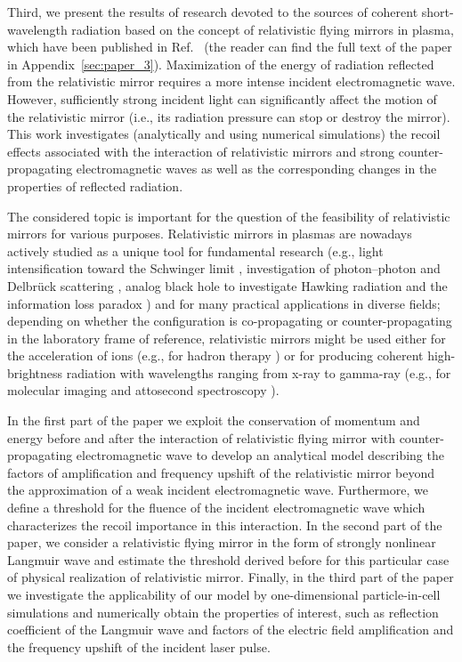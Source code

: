 \documentclass[10pt, twoside, a4paper, openright]{report}
\begin{document}
Third, we present the results of research devoted to the sources of coherent short-wavelength radiation based on the concept of relativistic flying mirrors in plasma, which have been published in Ref.~ (the reader can find the full text of the paper in Appendix~\ref{sec:paper_3}). Maximization of the energy of radiation reflected from the relativistic mirror requires a more intense incident electromagnetic wave. However, sufficiently strong incident light can significantly affect the motion of the relativistic mirror (i.e., its radiation pressure can stop or destroy the mirror). This work investigates (analytically and using numerical simulations) the recoil effects associated with the interaction of relativistic mirrors and strong counter-propagating electromagnetic waves as well as the corresponding changes in the properties of reflected radiation. 

The considered topic is important for the question of the feasibility of relativistic mirrors for various purposes. Relativistic mirrors in plasmas are nowadays actively studied as a unique tool for fundamental research (e.g., light intensification toward the Schwinger limit \cite{Bulanov2003}, investigation of photon–photon and Delbrück scattering \cite{Koga2012, Koga2018}, analog black hole to investigate Hawking radiation and the information loss paradox \cite{Chen2017, Chen2020}) and for many practical applications in diverse fields; depending on whether the configuration is co-propagating or counter-propagating in the laboratory frame of reference, relativistic mirrors might be used either for the acceleration of ions (e.g., for hadron therapy \cite{Bulanov2002}) or for producing coherent high-brightness radiation with wavelengths ranging from x-ray to gamma-ray (e.g., for molecular imaging \cite{Neutze2000} and attosecond spectroscopy \cite{Krausz2009}).

In the first part of the paper we exploit the conservation of momentum and energy before and after the interaction of relativistic flying mirror with counter-propagating electromagnetic wave to develop an analytical model describing the factors of amplification and frequency upshift of the relativistic mirror beyond the approximation of a weak incident electromagnetic wave. Furthermore, we define a threshold for the fluence of the incident electromagnetic wave which characterizes the recoil importance in this interaction. In the second part of the paper, we consider a relativistic flying mirror in the form of strongly nonlinear Langmuir wave and estimate the threshold derived before for this particular case of physical realization of relativistic mirror. Finally, in the third part of the paper we investigate the applicability of our model by one-dimensional particle-in-cell simulations and numerically obtain the properties of interest, such as reflection coefficient of the Langmuir wave and factors of the electric field amplification and the frequency upshift of the incident laser pulse.
\end{document}
